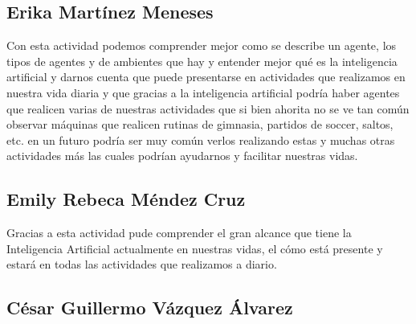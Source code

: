\documentclass{article}
\begin{document}
        \subsection{Erika Martínez Meneses}
            Con esta actividad podemos comprender mejor como se describe un agente, los tipos de agentes y de ambientes que hay y entender mejor qué es la inteligencia artificial y darnos cuenta que puede presentarse en actividades que realizamos en nuestra vida diaria y que gracias a la inteligencia artificial podría haber agentes que realicen varias de nuestras actividades que si bien ahorita no se ve tan común observar máquinas que realicen rutinas de gimnasia, partidos de soccer, saltos, etc. en un futuro podría ser  muy común verlos realizando estas y muchas otras actividades más las cuales podrían ayudarnos y facilitar nuestras vidas.

        \subsection{Emily Rebeca Méndez Cruz}
            Gracias a esta actividad pude comprender el gran alcance que tiene la Inteligencia Artificial actualmente en nuestras vidas, el cómo está presente y estará en todas las actividades que realizamos a diario.

        \subsection{César Guillermo Vázquez Álvarez}
            
\end{document}
